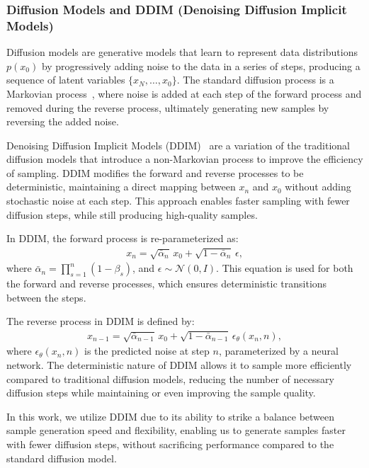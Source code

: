 \subsubsection{Diffusion Models and DDIM (Denoising Diffusion Implicit Models)}
Diffusion models are generative models that learn to represent data distributions \(p(x_0)\) by progressively adding noise to the data in a series of steps, producing a sequence of latent variables \(\{x_N, \ldots, x_0\}\). The standard diffusion process is a Markovian process~\citep{ho2020denoising,nichol2021improved}, where noise is added at each step of the forward process and removed during the reverse process, ultimately generating new samples by reversing the added noise.

Denoising Diffusion Implicit Models (DDIM)~\citep{song2020denoising} are a variation of the traditional diffusion models that introduce a non-Markovian process to improve the efficiency of sampling. DDIM modifies the forward and reverse processes to be deterministic, maintaining a direct mapping between \(x_n\) and \(x_0\) without adding stochastic noise at each step. This approach enables faster sampling with fewer diffusion steps, while still producing high-quality samples.

In DDIM, the forward process is re-parameterized as:
\begin{equation}
\begin{aligned}
x_n = \sqrt{\bar{\alpha}_n} \, x_0 + \sqrt{1 - \bar{\alpha}_n} \, \epsilon ,
\end{aligned}
\end{equation}
where \(\bar{\alpha}_n = \prod_{s=1}^n \left(1 - \beta_s\right)\), and \(\epsilon \sim \mathcal{N}(0, I)\). This equation is used for both the forward and reverse processes, which ensures deterministic transitions between the steps.

The reverse process in DDIM is defined by:
\begin{equation}
\begin{aligned}
x_{n-1} = \sqrt{\bar{\alpha}_{n-1}} \, x_0 + \sqrt{1 - \bar{\alpha}_{n-1}} \, \epsilon_\theta\left(x_n, n\right) ,
\end{aligned}
\end{equation}
where \(\epsilon_\theta\left(x_n, n\right)\) is the predicted noise at step \(n\), parameterized by a neural network. The deterministic nature of DDIM allows it to sample more efficiently compared to traditional diffusion models, reducing the number of necessary diffusion steps while maintaining or even improving the sample quality.

In this work, we utilize DDIM due to its ability to strike a balance between sample generation speed and flexibility, enabling us to generate samples faster with fewer diffusion steps, without sacrificing performance compared to the standard diffusion model.
